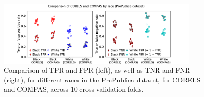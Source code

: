 %
%
%
%

\begin{figure}[t!]
\begin{center}
\includegraphics[trim={35mm, 0mm, 40mm, 0mm},
width=0.9\textwidth]{figs/compare_corels_compas.pdf}
\end{center}
\caption{Comparison of TPR and FPR (left), as well as TNR and FNR (right),
for different races in the ProPublica dataset, for CORELS and COMPAS,
across 10 cross-validation folds.
%
%
%
}
\label{fig:tpr-fpr}
\end{figure}

